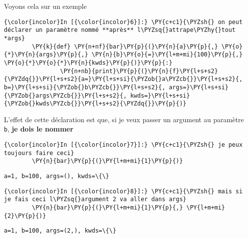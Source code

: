 Voyons cela sur un exemple

    \begin{Verbatim}[commandchars=\\\{\},frame=single,framerule=0.3mm,rulecolor=\color{cellframecolor}]
{\color{incolor}In [{\color{incolor}6}]:} \PY{c+c1}{\PYZsh{} on peut déclarer un paramètre nommé **après** l\PYZsq{}attrape\PYZhy{}tout *args}
        \PY{k}{def} \PY{n+nf}{bar}\PY{p}{(}\PY{n}{a}\PY{p}{,} \PY{o}{*}\PY{n}{args}\PY{p}{,} \PY{n}{b}\PY{o}{=}\PY{l+m+mi}{100}\PY{p}{,} \PY{o}{*}\PY{o}{*}\PY{n}{kwds}\PY{p}{)}\PY{p}{:}
                \PY{n+nb}{print}\PY{p}{(}\PY{n}{f}\PY{l+s+s2}{\PYZdq{}}\PY{l+s+s2}{a=}\PY{l+s+si}{\PYZob{}a\PYZcb{}}\PY{l+s+s2}{, b=}\PY{l+s+si}{\PYZob{}b\PYZcb{}}\PY{l+s+s2}{, args=}\PY{l+s+si}{\PYZob{}args\PYZcb{}}\PY{l+s+s2}{, kwds=}\PY{l+s+si}{\PYZob{}kwds\PYZcb{}}\PY{l+s+s2}{\PYZdq{}}\PY{p}{)}
\end{Verbatim}


    L'effet de cette déclaration est que, si je veux passer un argument au
paramètre \texttt{b}, \textbf{je dois le nommer}

    \begin{Verbatim}[commandchars=\\\{\},frame=single,framerule=0.3mm,rulecolor=\color{cellframecolor}]
{\color{incolor}In [{\color{incolor}7}]:} \PY{c+c1}{\PYZsh{} je peux toujours faire ceci}
        \PY{n}{bar}\PY{p}{(}\PY{l+m+mi}{1}\PY{p}{)}
\end{Verbatim}


    \begin{Verbatim}[commandchars=\\\{\},frame=single,framerule=0.3mm,rulecolor=\color{cellframecolor}]
a=1, b=100, args=(), kwds=\{\}
\end{Verbatim}

    \begin{Verbatim}[commandchars=\\\{\},frame=single,framerule=0.3mm,rulecolor=\color{cellframecolor}]
{\color{incolor}In [{\color{incolor}8}]:} \PY{c+c1}{\PYZsh{} mais si je fais ceci l\PYZsq{}argument 2 va aller dans args}
        \PY{n}{bar}\PY{p}{(}\PY{l+m+mi}{1}\PY{p}{,} \PY{l+m+mi}{2}\PY{p}{)}
\end{Verbatim}


    \begin{Verbatim}[commandchars=\\\{\},frame=single,framerule=0.3mm,rulecolor=\color{cellframecolor}]
a=1, b=100, args=(2,), kwds=\{\}
\end{Verbatim}


